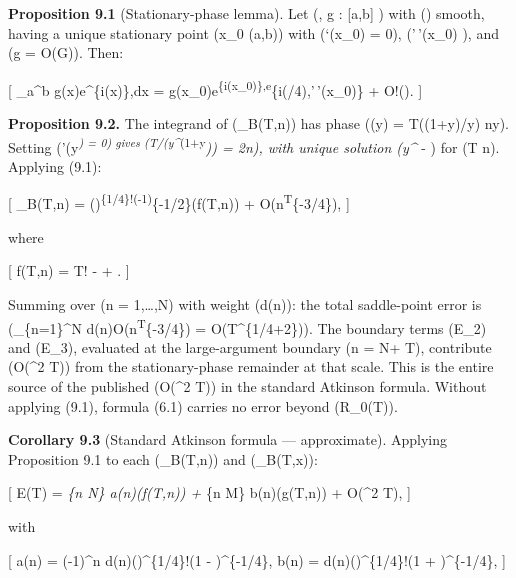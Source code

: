 \documentclass[
]{article}
\begin{document}
\textbf{Proposition 9.1} (Stationary-phase lemma). Let (\varphi, g :
{[}a,b{]} \to {}) with (\varphi) smooth, having a unique
stationary point (x\_0 \in (a,b)) with (\varphi`(x\_0) = 0),
(\varphi'\,'(x\_0) ), and (g = O(G)). Then:

{[} \int\_a\^{}b g(x)e\^{}\{i\lambda\varphi(x)\},dx =
g(x\_0)e\textsuperscript{\{i\lambda\varphi(x\_0)\},e}\{i(\pi/4),\varphi'\,'(x\_0)\}
+ O!\left(\right).  {]}

\textbf{Proposition 9.2.} The integrand of (\Psi\_B(T,n)) has phase
(\varphi(y) = T\log((1+y)/y) \pi ny). Setting
(\varphi'(y\textsuperscript{\emph{) = 0) gives (T/(y\^{}}(1+y}\emph{)) =
2\pi n), with unique solution (y\^{}} \approx {} -
) for (T \gg n). Applying (9.1):

{[} \Psi\_B(T,n) =
\left(\right)\textsuperscript{\{1/4\}!\left(-1\right)}\{-1/2\}\cos(f(T,n))
+ O(n\textsuperscript{\varepsilon T}\{-3/4\}), {]}

where

{[} f(T,n) = T! -
 + .  {]}

Summing over (n = 1,\ldots,N) with weight (d(n)): the total saddle-point
error is (\sum\_\{n=1\}\^{}N
d(n)O(n\textsuperscript{\varepsilon T}\{-3/4\}) =
O(T\^{}\{1/4+2\varepsilon\})). The boundary terms (E\_2) and (E\_3),
evaluated at the large-argument boundary (n = N+ \asymp T),
contribute (O(\log\^{}2 T)) from the stationary-phase remainder at that
scale. This is the entire source of the published (O(\log\^{}2 T)) in
the standard Atkinson formula. Without applying (9.1), formula (6.1)
carries no error beyond (R\_0(T)).

\textbf{Corollary 9.3} (Standard Atkinson formula --- approximate).
Applying Proposition 9.1 to each (\Psi\_B(T,n)) and (\Xi\_B(T,x)):

{[} E(T) = \sum\emph{\{n \le N\} a(n)\cos(f(T,n)) + \sum}\{n \le M\}
b(n)\cos(g(T,n)) + O(\log\^{}2 T),  {]}

with

{[} a(n) = (-1)\^{}n
d(n)\left(\right)\^{}\{1/4\}!\left(1 -
\right)\^{}\{-1/4\}, \qquad b(n) =
d(n)\left(\right)\^{}\{1/4\}!\left(1 +
\right)\^{}\{-1/4\}, {]}
\end{document}
